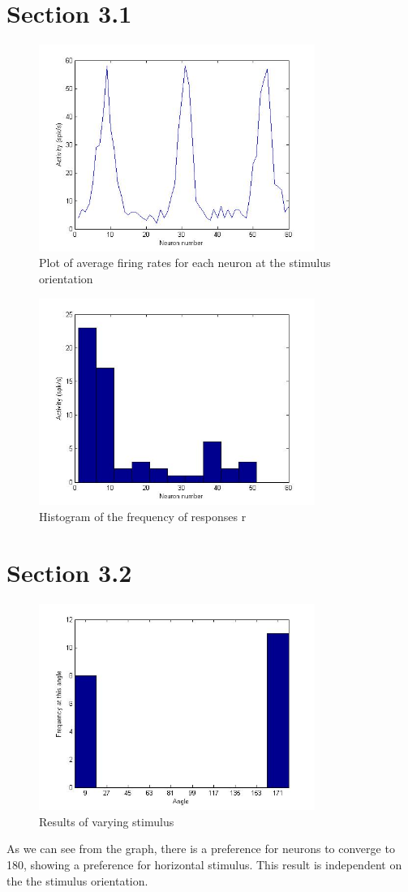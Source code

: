 \documentclass[11pt]{article}
\begin{document}
\section{Section 3.1}

\begin{figure}[H]
\centering
\includegraphics[width=90mm]{assignment1_images/31plot.jpg}
\caption{Plot of average firing rates for each neuron at the stimulus orientation}
\end{figure}

\begin{figure}[H]
\centering
\includegraphics[width=90mm]{assignment1_images/31hist.jpg}
\caption{Histogram of the frequency of responses r}
\end{figure}

\section{Section 3.2}

\begin{figure}[H]
\centering
\includegraphics[width=90mm]{assignment1_images/32angles.jpg}
\caption{Results of varying stimulus}
\end{figure}

As we can see from the graph, there is a preference for neurons to converge to 180, showing a preference for horizontal stimulus. This result is independent on the the stimulus orientation. 
\end{document}
